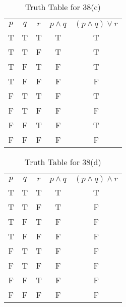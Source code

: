 \documentclass{Axon}
\begin{document}
\begin{table}[ht]
    \centering
    \begin{tabular}{c|c|c|c|c}
        \(p\) & \(q\) & \(r\) & \(p \land q\) & \((p \land q) \lor r\) \\
        T     & T     & T     & T             & T                      \\
        T     & T     & F     & T             & T                      \\
        T     & F     & T     & F             & T                      \\
        T     & F     & F     & F             & F                      \\
        F     & T     & T     & F             & T                      \\
        F     & T     & F     & F             & F                      \\
        F     & F     & T     & F             & T                      \\
        F     & F     & F     & F             & F
    \end{tabular}
    \caption{Truth Table for 38(c)}
\end{table}

\begin{table}[ht]
    \centering
    \begin{tabular}{c|c|c|c|c}
        \(p\) & \(q\) & \(r\) & \(p \land q\) & \((p \land q) \land r\) \\
        T     & T     & T     & T             & T                       \\
        T     & T     & F     & T             & F                       \\
        T     & F     & T     & F             & F                       \\
        T     & F     & F     & F             & F                       \\
        F     & T     & T     & F             & F                       \\
        F     & T     & F     & F             & F                       \\
        F     & F     & T     & F             & F                       \\
        F     & F     & F     & F             & F                      
    \end{tabular}
    \caption{Truth Table for 38(d)}
\end{table}
\end{document}
